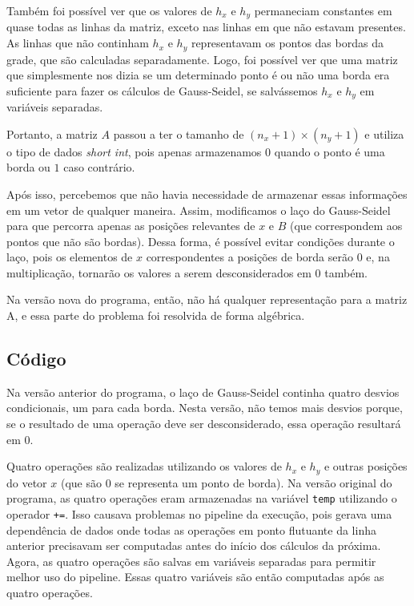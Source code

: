 \documentclass[12pt]{article}
\begin{document}
	Também foi possível ver que os valores de $h_x$ e $h_y$ permaneciam constantes em quase todas as linhas da matriz, exceto nas linhas em que não estavam presentes.
	As linhas que não continham $h_x$ e $h_y$ representavam os pontos das bordas da grade, que são calculadas separadamente.
	Logo, foi possível ver que uma matriz que simplesmente nos dizia se um determinado ponto é ou não uma borda era suficiente para fazer os cálculos de Gauss-Seidel, se salvássemos $h_x$ e $h_y$ em variáveis separadas.
	
	Portanto, a matriz $A$ passou a ter o tamanho de $(n_x+1)\times(n_y+1)$ e utiliza o tipo de dados \emph{short int}, pois apenas armazenamos $0$ quando o ponto é uma borda ou $1$ caso contrário.
	
	Após isso, percebemos que não havia necessidade de armazenar essas informações em um vetor de qualquer maneira.
	Assim, modificamos o laço do Gauss-Seidel para que percorra apenas as posições relevantes de $x$ e $B$ (que correspondem aos pontos que não são bordas).
	Dessa forma, é possível evitar condições durante o laço, pois os elementos de $x$ correspondentes a posições de borda serão $0$ e, na multiplicação, tornarão os valores a serem desconsiderados em $0$ também.
	
	Na versão nova do programa, então, não há qualquer representação para a matriz A, e essa parte do problema foi resolvida de forma algébrica.

	\subsection{Código}
	
	Na versão anterior do programa, o laço de Gauss-Seidel continha quatro desvios condicionais, um para cada borda.
	Nesta versão, não temos mais desvios porque, se o resultado de uma operação deve ser desconsiderado, essa operação resultará em $0$.
	
	Quatro operações são realizadas utilizando os valores de $h_x$ e $h_y$ e outras posições do vetor $x$ (que são $0$ se representa um ponto de borda).
	Na versão original do programa, as quatro operações eram armazenadas na variável \texttt{temp} utilizando o operador \texttt{+=}.
	Isso causava problemas no pipeline da execução, pois gerava uma dependência de dados onde todas as operações em ponto flutuante da linha anterior precisavam ser computadas antes do início dos cálculos da próxima.
	Agora, as quatro operações são salvas em variáveis separadas para permitir melhor uso do pipeline. 
	Essas quatro variáveis são então computadas após as quatro operações.
	
\end{document}

